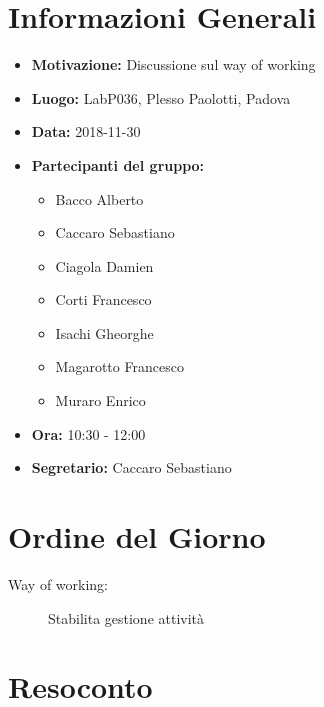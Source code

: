 \documentclass[a4paper, oneside, openany, dvipsnames, table]{article}
\begin{document}
\copertina{}


\newpage
\tableofcontents
\newpage
\section{Informazioni Generali}
\begin{itemize}
\item \textbf{Motivazione:} Discussione sul way of working
\item \textbf{Luogo:} LabP036, Plesso Paolotti, Padova
\item \textbf{Data:} 2018-11-30
\item \textbf{Partecipanti del gruppo:} \hfill
	\begin{itemize}
	\item Bacco Alberto
	\item Caccaro Sebastiano
	\item Ciagola Damien
	\item Corti Francesco
	\item Isachi Gheorghe
	\item Magarotto Francesco
	\item Muraro Enrico
	\end{itemize} 
\item \textbf{Ora:} 10:30 - 12:00
\item \textbf{Segretario:} Caccaro Sebastiano
\end{itemize}

\section{Ordine del Giorno}
\begin{description}
\item [Way of working: ] Stabilita gestione attività
\end{description}

\section{Resoconto}
\end{document}
